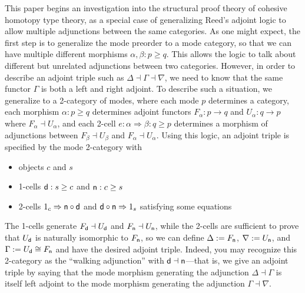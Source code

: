 \documentclass{drl-common/llncs}
\newcommand{\la}{\ensuremath{\dashv}}
\newcommand{\tc}[2]{\ensuremath{#1 \Rightarrow #2}}
\newcommand\compo[2]{\ensuremath{#1 \circ #2}}
\begin{document}
This paper begins an investigation into the structural proof theory of
cohesive homotopy type theory, as a special case of generalizing Reed's
adjoint logic to allow multiple adjunctions between the same categories.
As one might expect, the first step is to generalize the mode preorder
to a mode category, so that we can have multiple different morphisms
$\alpha, \beta : p\ge q$.  This allows the logic to talk about different
but unrelated adjunctions between two categories.  However, in order to
describe an adjoint triple such as $\Delta \la \Gamma \la \nabla$, we
need to know that the same functor $\Gamma$ is both a left and right
adjoint.  To describe such a situation, we generalize to a 2-category of
modes, where each mode $p$ determines a category, each morphism $\alpha
: p \ge q$ determines adjoint functors $F_\alpha : p \to q$ and
$U_\alpha : q \to p$ where $F_\alpha \la U_\alpha$, and each 2-cell $e :
\tc \alpha  \beta : q \ge p$ determines a morphism of adjunctions between 
$F_\beta \la U_\beta$ and $F_\alpha \la U_\alpha$.  Using this logic, an
adjoint triple is specified by the mode 2-category with
\begin{itemize}
\item objects $c$ and $s$
\item 1-cells $\mathsf{d} : s \ge c$ and $\mathsf{n} : c \ge s$
\item 2-cells $\tc {1_c} {\compo{\dsd{n}}{\dsd{d}}}$ 
and $\tc {\compo{\dsd{d}}{\dsd{n}}} {1_s}$ satisfying 
some equations
\end{itemize}
The 1-cells generate $F_{\dsd d} \la U_{\dsd d}$ and $F_{\dsd n} \la
U_{\dsd n}$, while the 2-cells are sufficient to prove that $U_{\mathsf{d}}$ is
naturally isomorphic to $F_{\mathsf{n}}$, so we can define $\Delta :=
F_{\mathsf{n}}$, $\nabla := U_{\mathsf{n}}$, and $\Gamma := U_{\mathsf{d}} \cong F_{\mathsf{n}}$
and have the desired adjoint triple.  Indeed, you may recognize this
2-category as the ``walking adjunction'' with $\dsd d \la \dsd n$---that
is, we give an adjoint triple by saying that the mode morphism generating
the adjunction $\Delta\la \Gamma$ is itself left adjoint to the mode morphism generating the
adjunction $\Gamma\la\nabla$.
\end{document}
